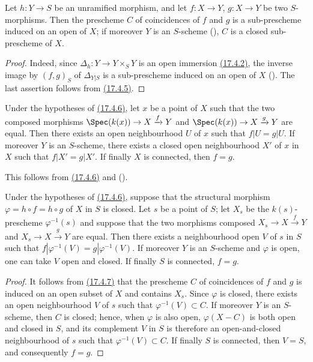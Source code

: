 \begin{proposition}[17.4.6]
\label{IV.17.4.6}
Let $h:Y\to S$ be an unramified morphism, and let $f:X\to Y$, $g:X\to Y$ be two $S$-morphisms.
Then the prescheme $C$ of coincidences of $f$ and $g$ is a sub-prescheme induced on an open of $X$; if moreover $Y$ is an $S$-scheme (), $C$ is a closed sub-prescheme of $X$.
\end{proposition}

\begin{proof}
Indeed, since $\Delta_h:Y\to Y\times_S Y$ is an open immersion {\hyperlink{ega4.c04.cor.17-4-2}{(17.4.2)}}, the inverse image by $(f,g)_S$ of $\Delta_{Y|S}$ is a sub-prescheme induced on an open of $X$ ().
The last assertion follows from {\hyperlink{ega4.c04.statement.17-4-5}{(17.4.5)}}.
\end{proof}

\begin{corollary}[17.4.7]
\label{IV.17.4.7}
Under the hypotheses of {\hyperlink{ega4.c04.prop.17-4-6}{(17.4.6)}}, let $x$ be a point of $X$ such that the two composed morphisms $\Spec(k(x))\to X\xrightarrow{f} Y$ and $\Spec(k(x))\to X\xrightarrow{g} Y$ are equal.
Then there exists an open neighbourhood $U$ of $x$ such that $f|U=g|U$.
If moreover $Y$ is an $S$-scheme, there exists a closed open neighbourhood $X'$ of $x$ in $X$ such that $f|X'=g|X'$.
If finally $X$ is connected, then $f=g$.
\end{corollary}

This follows from {\hyperlink{ega4.c04.prop.17-4-6}{(17.4.6)}} and ().

\begin{corollary}[17.4.8]
\label{IV.17.4.8}
Under the hypotheses of {\hyperlink{ega4.c04.prop.17-4-6}{(17.4.6)}}, suppose that the structural morphism $\varphi=h\circ f=h\circ g$ of $X$ in $S$ is closed.
Let $s$ be a point of $S$; let $X_s$ be the $k(s)$-prescheme $\varphi^{-1}(s)$ and suppose that the two morphisms composed $X_s\to X\xrightarrow{f} Y$ and $X_s\to X\xrightarrow{g} Y$ are equal.
Then there exists a neighbourhood open $V$ of $s$ in $S$ such that $f|\varphi^{-1}(V)=g|\varphi^{-1}(V)$.
If moreover $Y$ is an $S$-scheme and $\varphi$ is open, one can take $V$ open and closed.
If finally $S$ is connected, $f=g$.
\end{corollary}

\begin{proof}
It follows from {\hyperlink{ega4.c04.cor.17-4-7}{(17.4.7)}} that the prescheme $C$ of coincidences of $f$ and $g$ is induced on an open subset of $X$ and contains $X_s$.
Since $\varphi$ is closed, there exists an open neighbourhood $V$ of $s$ such that $\varphi^{-1}(V)\subset C$.
If moreover $Y$ is an $S$-scheme, then $C$ is closed; hence, when $\varphi$ is also open, $\varphi(X-C)$ is
both open and closed in $S$, and its complement $V$ in $S$ is therefore an open-and-closed neighbourhood of $s$ such that $\varphi^{-1}(V)\subset C$.
If finally $S$ is connected, then $V=S$, and consequently $f=g$.
\end{proof}

